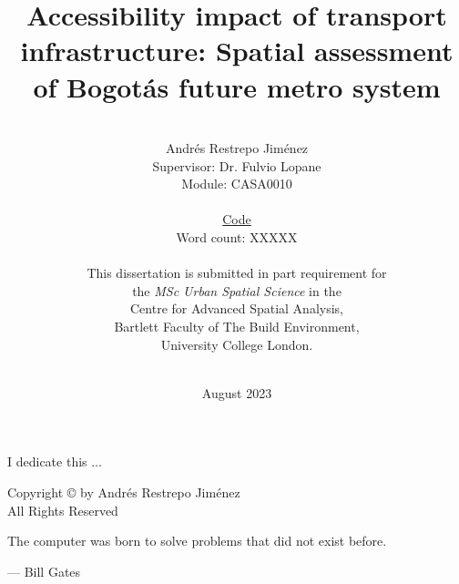 \documentclass[12pt, a4paper]{report}
\date{August 2023}
\title{Accessibility impact of transport infrastructure: Spatial assessment of Bogot\'{a}\textquotesingle s future metro system}
\author{\\ \Large{Andr\'{e}s Restrepo Jim\'{e}nez}
\\ Supervisor: Dr. Fulvio Lopane 
\\ Module: CASA0010
\\
\\ \href{https://github.com/rpoandres/MSc_USS_Dissertation}{Code}
\\ Word count: XXXXX
\\
\\
This dissertation is submitted in part requirement for \\the \textit{MSc Urban Spatial Science} in the \\Centre for Advanced Spatial Analysis, \\Bartlett Faculty of The Build Environment, \\University College London.
\\ \\
}
\begin{document}
      

\thispagestyle{headings}
\maketitle
\FloatBarrier
{}

\thispagestyle{empty}
\begin{abstract}


\end{abstract}
\newpage
\thispagestyle{empty}
\begin{center}
I dedicate this ...
\end{center}

\newpage
\thispagestyle{empty}
\vspace*{\fill}
\begin{center}
Copyright \copyright  {} by Andr\'{e}s Restrepo Jim\'{e}nez \\ All Rights Reserved
\end{center}
\vspace*{\fill}
\newpage
\thispagestyle{empty}
\epigraph{The computer was born to solve problems that did not exist before.}{--- \textup{Bill Gates}}
\end{document}
